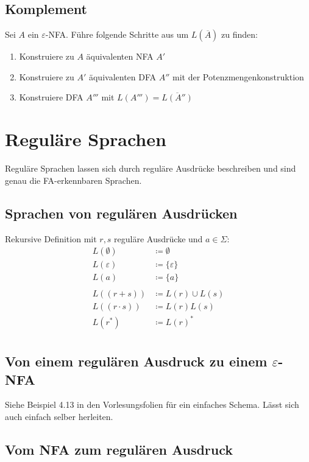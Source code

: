 \documentclass[11pt]{scrartcl}
\begin{document}
\subsection{Komplement}
Sei $A$ ein $\varepsilon$-NFA. Führe folgende Schritte aus um $L(\overline{A})$ zu finden:
\begin{enumerate}
	\item Konstruiere zu $A$ äquivalenten NFA $A'$
    \item Konstruiere zu $A'$ äquivalenten DFA $A''$ mit der Potenzmengenkonstruktion
    \item Konstruiere DFA $A'''$ mit $L(A''')=\overline{L(A'')}$
\end{enumerate}

\section{Reguläre Sprachen}
Reguläre Sprachen lassen sich durch reguläre Ausdrücke beschreiben und sind genau die FA-erkennbaren Sprachen.

\subsection{Sprachen von regulären Ausdrücken}
Rekursive Definition mit $r, s$ reguläre Ausdrücke und $a \in \Sigma$:
\begin{align*}
L(\emptyset) &\coloneqq \emptyset \\
L(\varepsilon) &\coloneqq \{\varepsilon\} \\
L(a) &\coloneqq \{a\} \\
\\
L((r+s)) &\coloneqq L(r) \cup L(s) \\
L((r\cdot s)) &\coloneqq L(r)L(s) \\
L(r^*) &\coloneqq L(r)^* \\
\end{align*}


\subsection{Von einem regulären Ausdruck zu einem $\varepsilon$-NFA}
Siehe Beispiel 4.13 in den Vorlesungsfolien für ein einfaches Schema. Lässt sich auch einfach selber herleiten. %

\subsection{Vom NFA zum regulären Ausdruck}
\end{document}
